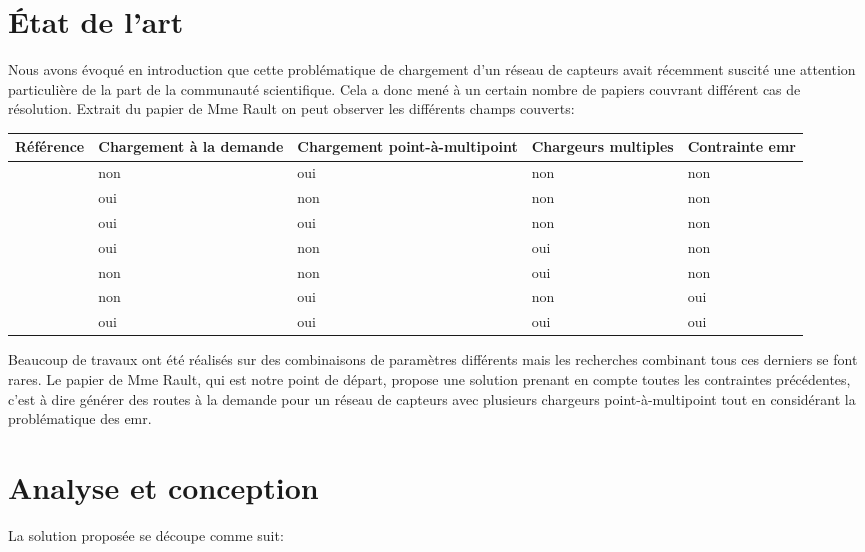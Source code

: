\documentclass[noposter]{polytech}
\begin{document}
\chapter{État de l'art}
	Nous avons évoqué en introduction que cette problématique de chargement d'un réseau de capteurs avait récemment suscité une attention particulière de la part de la communauté scientifique.
	Cela a donc mené à un certain nombre de papiers couvrant différent cas de résolution.
	Extrait du papier de Mme Rault \cite{Rault:chargers} on peut observer les différents champs couverts:
	
	\begin{center}
		\centering
		\begin{tabularx}{\textwidth}{|c||X|X|X|X|}
			\hline
			Référence & Chargement à la demande & Chargement point-à-multipoint & Chargeurs multiples & Contrainte \gls{emr}\\\hline\hline
			\cite{6275766} \cite{LIN2016381} & non & oui & non & non\\\hline
			\cite{6911792} \cite{1999253} & oui & non & non & non\\\hline
			\cite{KHELLADI201744} & oui & oui & non & non\\\hline
			\cite{LIN201688} \cite{Madhja2015} \cite{wang2013multi} \cite{Jiang2014} & oui & non & oui & non\\\hline
			\cite{7889006} & non & non & oui & non\\\hline
			\cite{NIKOLETSEAS20171} \cite{8051273} \cite{6888920} \cite{7524385} & non & oui & non & oui\\\hline\hline
			\rowcolor{polytechlightblue}
			\cite{Rault:chargers} & oui & oui & oui & oui\\\hline
		\end{tabularx}	
	\end{center}
	
	Beaucoup de travaux ont été réalisés sur des combinaisons de paramètres différents mais les recherches combinant tous ces derniers se font rares.
	Le papier de Mme Rault, qui est notre point de départ, propose une solution prenant en compte toutes les contraintes précédentes, c'est à dire générer des routes à la demande pour un réseau de capteurs avec plusieurs chargeurs point-à-multipoint tout en considérant la problématique des \gls{emr}.

\chapter{Analyse et conception}
	La solution proposée se découpe comme suit:
	
\end{document}
